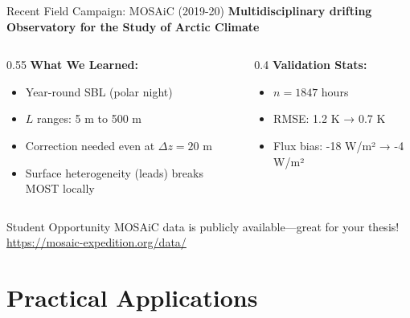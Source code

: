 \documentclass[10pt,aspectratio=169]{beamer}
\begin{document}
\begin{frame}{Recent Field Campaign: MOSAiC (2019-20)}
  \textbf{Multidisciplinary drifting Observatory for the Study of Arctic Climate}
  
  \vspace{0.3cm}
  \begin{columns}[T]
    \begin{column}{0.55\textwidth}
      \textbf{What We Learned:}
      \begin{itemize}
        \item Year-round SBL (polar night)
        \item $L$ ranges: 5 m to 500 m
        \item Correction needed even at $\Delta z = 20$ m
        \item Surface heterogeneity (leads) breaks MOST locally
      \end{itemize}
    \end{column}
    \begin{column}{0.4\textwidth}
      \textbf{Validation Stats:}
      \begin{itemize}
        \item $n = 1847$ hours
        \item RMSE: 1.2 K → \alert{0.7 K}
        \item Flux bias: -18 W/m² → \alert{-4 W/m²}
      \end{itemize}
    \end{column}
  \end{columns}
  
  \vspace{0.5cm}
  \begin{exampleblock}{Student Opportunity}
    MOSAiC data is \alert{publicly available}—great for your thesis!\\
    \url{https://mosaic-expedition.org/data/}
  \end{exampleblock}
\end{frame}

\section{Practical Applications}
\end{document}
